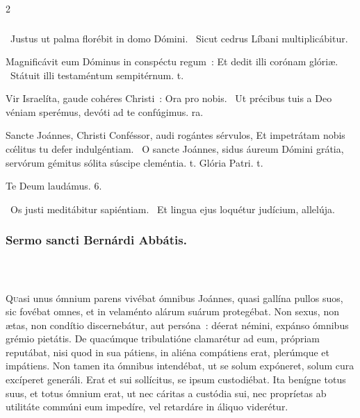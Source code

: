 \documentclass[9pt,twoside]{extarticle}
\begin{document}
\begin{multicols}{2}
\subsubsection*{}
\begin{tightlist}{}
\item {}~Justus ut palma florébit in domo Dómini. ~Sicut cedrus Líbani multiplicábitur.
\item {} Magnificávit eum Dóminus in conspéctu regum~: \textred{*} Et dedit illi corónam glóriæ. ~Státuit illi testaméntum sempitérnum. t.
\item {} Vir Israelíta, gaude cohéres Christi~: \textred{*} Ora pro nobis. ~Ut précibus tuis a Deo véniam sperémus, devóti ad te confúgimus. ra.
\item {} Sancte Joánnes, Christi Conféssor, audi rogántes sérvulos, \textred{*} Et impetrátam nobis cœ́litus tu defer indulgéntiam. ~O sancte Joánnes, sidus áureum Dómini grátia, servórum gémitus sólita súscipe cleméntia. t. Glória Patri. t. 
\item Te Deum laudámus. 6.
\item {}~Os justi meditábitur sapiéntiam. ~Et lingua ejus loquétur judícium, allelúja.
\end{tightlist}

\begin{tightlist}{}
\item {}
\end{tightlist}

\subsubsection*{\center Sermo sancti Bernárdi Abbátis.}
\subsubsection*{\center {}\\
}
\lettrine{Q}uasi unus ómnium parens vivébat ómnibus Joánnes, quasi gallína pullos suos, sic fovébat omnes, et in velaménto alárum suárum protegébat. Non sexus, non ætas, non condítio discernebátur, aut persóna~: déerat némini, expánso ómnibus grémio pietátis. De quacúmque tribulatióne clamarétur ad eum, própriam reputábat, nisi quod in sua pátiens, in aliéna compátiens erat, plerúmque et impátiens. Non tamen ita ómnibus intendébat, ut se solum expóneret, solum cura excíperet generáli. Erat et sui sollícitus, se ipsum custodiébat. Ita benígne totus suus, et totus ómnium erat, ut nec cáritas a custódia sui, nec propríetas ab utilitáte commúni eum impedíre, vel retardáre in áliquo viderétur.


\end{multicols}
\end{document}
